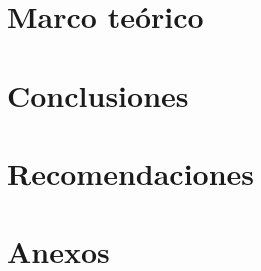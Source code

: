 \documentclass[11pt, letterpaper, twoside, openright]{report}
\newcommand{\defaultparformat}[1]{
	{\setlength{\parskip}{2ex}
     }
}
\begin{document}
\ifdefined\CAPmarcoteorico
	\newpage
	\chapter{Marco teórico}
	\ifdefined\parpordefecto
		\defaultparformat{i-marco_teorico}
	\else
		
	\fi
\fi

\newpage
\ifdefined\parpordefecto
	\defaultparformat{j-capitulos}
\else
	
\fi

\ifdefined\CAPconclusiones
	\newpage
	\chapter{Conclusiones}
	\ifdefined\parpordefecto
		\defaultparformat{k-conclusiones}
	\else
		
	\fi
\fi

\ifdefined\CAPrecomendaciones
	\newpage
	\chapter{Recomendaciones}
	\ifdefined\parpordefecto
		\defaultparformat{l-recomendaciones}
	\else
		
	\fi
\fi

\ifdefined\CAPbibliografia
	\newpage
    \cleardoublepage{}
	\chapter{\bibname}
    \printbibliography[heading=none]
\fi

\ifdefined\CAPanexos
	\newpage
	\chapter{Anexos}
	\ifdefined\parpordefecto
		\defaultparformat{n-anexos}
	\else
		
	\fi
\fi

\ifdefined\CAPglosario
	\newpage
	\printglossary
\fi
\end{document}
